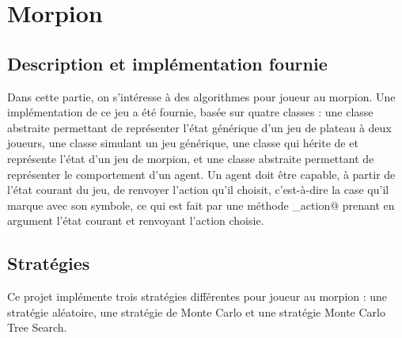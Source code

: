 \documentclass[a4paper,11pt]{article}
\begin{document}
\newpage

\mbox{}

\newpage

\section{Morpion}
\label{SecMorpion}

\subsection{Description et implémentation fournie}

Dans cette partie, on s'intéresse à des algorithmes pour joueur au morpion. Une implémentation de ce jeu a été fournie, basée sur quatre classes : une classe abstraite \verb@State@ permettant de représenter l'état générique d'un jeu de plateau à deux joueurs, une classe \verb@Jeu@ simulant un jeu générique, une classe \verb@MorpionState@ qui hérite de \verb@State@ et représente l'état d'un jeu de morpion, et une classe abstraite \verb@Agent@ permettant de représenter le comportement d'un agent. Un agent doit être capable, à partir de l'état courant du jeu, de renvoyer l'action qu'il choisit, c'est-à-dire la case qu'il marque avec son symbole, ce qui est fait par une méthode \verb@get_action@ prenant en argument l'état courant \verb@state@ et renvoyant l'action choisie.

\subsection{Stratégies}

Ce projet implémente trois stratégies différentes pour joueur au morpion : une stratégie aléatoire, une stratégie de Monte Carlo et une stratégie Monte Carlo Tree Search.
\end{document}
